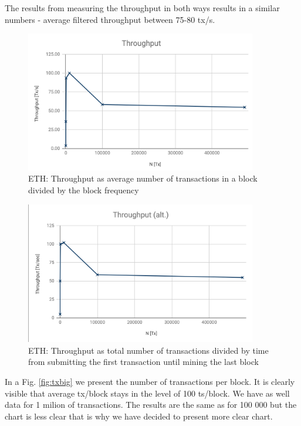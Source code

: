 \documentclass[12pt]{article}
\begin{document}
 
The results from measuring the throughput in both ways results in a similar numbers - average filtered throughput between 75-80 tx/s. 

\begin{figure}[h]
    \centering
    \includegraphics[width=0.9\textwidth]{img/Throughput_ETH.png}
    \caption{ETH: Throughput as average number of transactions in a block divided by the block frequency}
    \label{fig:throughput1}
\end{figure}

\begin{figure}[h]
    \centering
    \includegraphics[width=0.9\textwidth]{img/Throughputalt.png}
    \caption{ETH: Throughput as total number of transactions divided by time from submitting the first transaction until mining the last block}
    \label{fig:throughput2}
\end{figure}

In a Fig. \ref{fig:txbig} we present the number of transactions per block. It is clearly visible that average tx/block stays in the level of 100 ts/block. We have as well data for 1 milion of transactions. The results are the same as for 100 000 but the chart is less clear that is why we have decided to present more clear chart.
\end{document}
